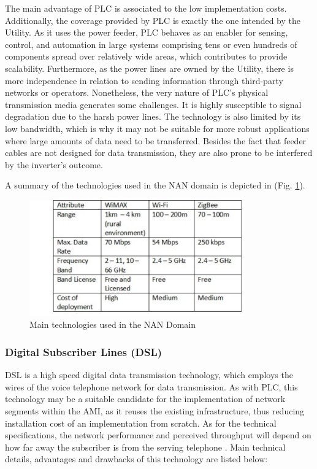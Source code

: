 \documentclass[11pt,draftclsnofoot,onecolumn]{IEEEtran}
\begin{document}
The main advantage of PLC is associated to the low implementation costs. Additionally, the coverage provided by PLC is exactly the one intended by the Utility. As it uses the power feeder, PLC behaves as an enabler for sensing, control, and automation in large systems comprising tens or even hundreds of components spread over relatively wide areas, which contributes to provide scalability. Furthermore, as the power lines are owned by the Utility, there is more independence in relation to sending information through third-party networks or operators. Nonetheless, the very nature of  PLC's physical transmission media generates some challenges. It is highly susceptible to signal degradation due to the harsh power lines. The technology is also limited by its low bandwidth, which is why it may not be suitable for more robust applications where large amounts of data need to be transferred. Besides the fact that feeder cables are not designed for data transmission, they are also prone to be interfered by the inverter’s outcome. %

A summary of the technologies used in the NAN domain is depicted in (Fig. \ref{fig:nan}).

\begin{figure}[h!]
\centering
\includegraphics [height=5cm] {NANTechnologies}
\caption{Main technologies used in the NAN Domain}
\label{fig:nan}
\end{figure}


\subsubsection{Digital Subscriber Lines (DSL)}\label{dsl}
DSL is a high speed digital data transmission technology, which employs the wires of the voice telephone network for data transmission. As with PLC, this technology may be a suitable candidate for the implementation of network segments within the AMI, as it reuses the existing infrastructure, thus reducing installation cost of an implementation from scratch. As for the technical specifications, the network performance and perceived throughput will depend on how far away the subscriber is from the serving telephone  \cite{Gungor2011}. Main technical details, advantages and drawbacks of this technology are listed below:
\end{document}
